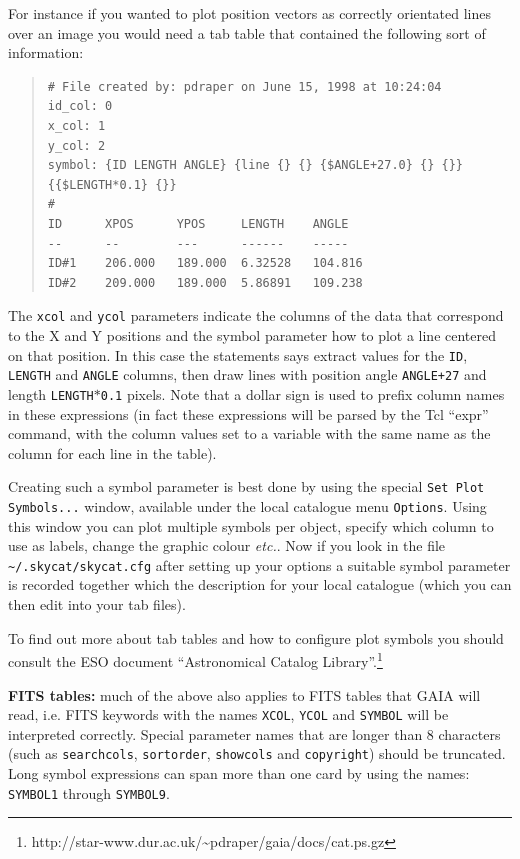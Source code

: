 \documentclass[twoside,11pt]{article}
\newcommand{\htmladdnormallinkfoot}[2]{#1\footnote{#2}}
\renewcommand{\_}{\texttt{\symbol{95}}}
\newcommand{\mytt}[1]{{\tt{#1}}}
\begin{document}
For instance if you wanted to plot position vectors as correctly
orientated lines over an image you would need a tab table that
contained the following sort of information:
\begin{quote}
\begin{verbatim}
# File created by: pdraper on June 15, 1998 at 10:24:04
id_col: 0
x_col: 1
y_col: 2
symbol: {ID LENGTH ANGLE} {line {} {} {$ANGLE+27.0} {} {}} {{$LENGTH*0.1} {}}
#
ID      XPOS      YPOS     LENGTH    ANGLE
--      --        ---      ------    -----
ID#1    206.000   189.000  6.32528   104.816
ID#2    209.000   189.000  5.86891   109.238
\end{verbatim}
\end{quote}
The \mytt{x\_col} and \mytt{y\_col} parameters indicate the columns of
the data that correspond to the X and Y positions and the symbol
parameter how to plot a line centered on that position. In this case
the statements says extract values for the \mytt{ID}, \mytt{LENGTH}
and \mytt{ANGLE} columns, then draw lines with position angle
\mytt{ANGLE+27} and length \mytt{LENGTH$*$0.1} pixels. Note that a
dollar sign is used to prefix column names in these expressions (in
fact these expressions will be parsed by the Tcl ``expr'' command,
with the column values set to a variable with the same name as the
column for each line in the table).

Creating such a symbol parameter is best done by using the special
\mytt{Set Plot Symbols...} window, available under the local catalogue
menu \mytt{Options}. Using this window you can plot multiple symbols per
object, specify which column to use as labels, change the graphic
colour {\em etc.}. Now if you look in the file
\mytt{\~{}/.skycat/skycat.cfg} after setting up your options a suitable
symbol parameter is recorded together which the description for your
local catalogue (which you can then edit into your tab files).

To find out more about tab tables and how to configure plot symbols
you should consult the ESO document
\htmladdnormallinkfoot{``Astronomical Catalog Library''.}
{http://star-www.dur.ac.uk/\~{}pdraper/gaia/docs/cat.ps.gz}

\textbf{FITS tables:} much of the above also applies to FITS tables
that GAIA will read, i.e. FITS keywords with the names \mytt{X\_COL},
\mytt{Y\_COL} and \mytt{SYMBOL} will be interpreted
correctly. Special parameter names that are longer than 8 characters
(such as \mytt{search\_cols}, \mytt{sort\_order}, \mytt{show\_cols}
and \mytt{copyright}) should be truncated. Long symbol expressions can
span more than one card by using the names: \mytt{SYMBOL1} through
\mytt{SYMBOL9}.
\end{document}
